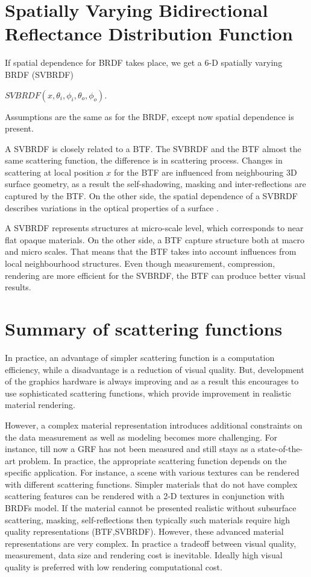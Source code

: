 \section{Spatially Varying Bidirectional Reflectance Distribution Function}
\label{section:svbrdf}
If spatial dependence for BRDF takes place, we get a 6-D spatially varying BRDF (SVBRDF)


 \begin{center}
$SVBRDF(x,\theta_{i} ,\phi_{i},\theta_{o} ,\phi_{o})$.
 \end{center}
 Assumptions are the same as for the BRDF, except now spatial dependence is present.
 
A SVBRDF is closely related to a BTF. The SVBRDF and the BTF almost the same scattering function, the difference is in scattering process. 
Changes in scattering at local position $x$ for the BTF are influenced from neighbouring 3D surface geometry, as a result the self-shadowing, masking and inter-reflections are captured by the BTF.
On the other side, the spatial dependence of a SVBRDF describes variations in the optical properties of a surface \cite{haindl_visual}.


 
A SVBRDF represents structures at micro-scale level, which corresponds to near flat opaque materials. On the other side, a BTF capture structure both at macro and micro scales.
 That means that the BTF takes into account influences from local neighbourhood structures. Even though measurement, compression, rendering are more efficient for the SVBRDF, 
 the BTF can produce better visual results. \cite{haindl_visual}

\section{Summary of scattering functions}
\label{section:attrib}
In practice, an advantage of simpler scattering function is a computation efficiency, 
while a disadvantage is a reduction of visual quality. 
But, development of the graphics hardware is always improving and 
as a result this encourages to use sophisticated scattering functions, which provide improvement in realistic material rendering. 
 
However, a complex material representation introduces additional constraints on the data measurement as well as modeling becomes more challenging.
For instance, till now a GRF has not been measured and still stays as a state-of-the-art problem.
In practice, the appropriate scattering function depends on the specific application.
For instance, a scene with various textures can be rendered with different scattering functions. 
Simpler materials that do not have complex scattering features can be rendered with a 2-D textures in conjunction with BRDFs model. 
If the material cannot be presented realistic without subsurface scattering, masking, self-reflections then typically such materials require high quality representations (BTF,SVBRDF).
However, these advanced material representations are very complex.
In practice a tradeoff between visual quality, measurement, data size and rendering cost is inevitable. 
Ideally high visual quality is preferred with low rendering computational cost.


